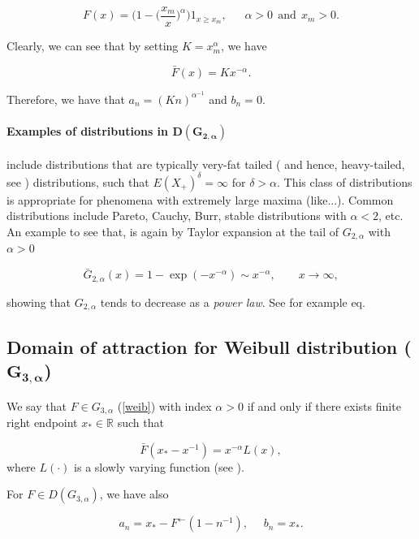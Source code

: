 \documentclass[11pt,a4paper,openany ]{book}
\begin{document}
\begin{equation*}
F(x)=\bigg(1-\big(\frac{x_m}{x}\big)^{\alpha}\bigg)1_{x\geq x_m}, \ \ \ \ \ \ \ \alpha>0 \  \ \text{and} \ \ x_m>0.
\end{equation*}

Clearly, we can see that by setting $K=x_m^{\alpha}$, we have

\begin{equation*}
\bar{F}(x)=Kx^{-\alpha}.
\end{equation*}

Therefore, we have that $a_n=(Kn)^{\alpha^{-1}}$ and $b_n=0$.

\paragraph{Examples of distributions in $\boldsymbol{D(G_{2,\alpha})}$} include distributions that are typically very-fat tailed ( and hence, heavy-tailed, see ) distributions, such that $E(X_+)^{\delta}=\infty$ for $\delta>\alpha$. This class of distributions is appropriate for phenomena with extremely large maxima (like...). \cite{domain of attraction course} Common distributions include Pareto, Cauchy, Burr, stable distributions with $\alpha<2$, etc.
An example to see that, is again by Taylor expansion at the tail of $G_{2,\alpha}$ with $\alpha>0$ 

\begin{equation}
\bar{G}_{2,\alpha}(x)=1-\exp(-x^{-\alpha})\sim x^{-\alpha}, \ \ \ \ \ \ \ \ \ x\to\infty,
\end{equation}

showing that $G_{2,\alpha}$ tends to decrease as a \emph{power law}.
See for example eq.

\subsection*{Domain of attraction for Weibull distribution ($\mathbf{G_{3,\alpha}}$) }
We say  that $F\in G_{3,\alpha}$ (\ref{weib}) with index $\alpha>0$ if and only if there exists finite right endpoint $x_*\in\mathbb{R}$ such that 

\begin{equation}
\bar{F}(x_*-x^{-1})=x^{-\alpha}L(x),
\end{equation}
where $L(\cdot)$ is a slowly varying function (see ).

For $F\in D(G_{3,\alpha})$, we have also

\begin{equation*}
a_n=x_*-F^{\leftarrow}(1-n^{-1}), \ \  \ \ \ \ b_n=x_*.
\end{equation*}
\end{document}
